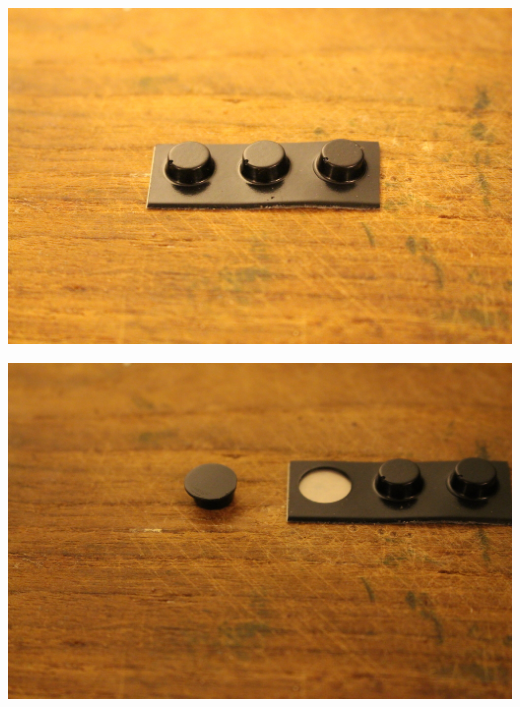 \documentclass{article}
\begin{document}
\begin{minipage}[b]{0.5\textwidth}
	\includegraphics[width=\textwidth]{Bilder2019/IMG_6478.JPG}
\end{minipage}
\begin{minipage}[b]{0.5\textwidth}
	\includegraphics[width=\textwidth]{Bilder2019/IMG_6479.JPG}
\end{minipage}

\vspace{0.5cm}
\end{document}
